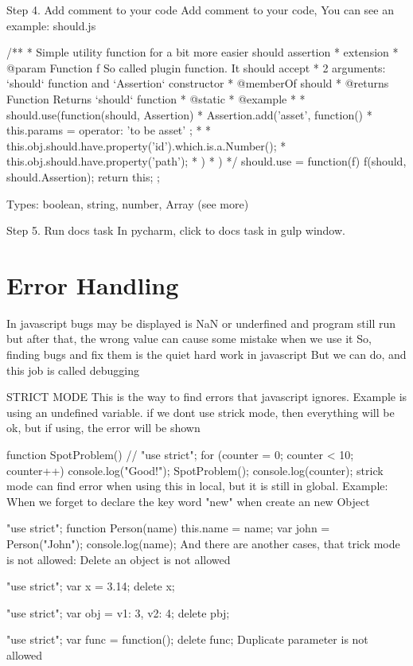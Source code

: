 Step 4. Add comment to your code
Add comment to your code, You can see an example: should.js

/**
 * Simple utility function for a bit more easier should assertion
 * extension
 * @param {Function} f So called plugin function. It should accept
 * 2 arguments: `should` function and `Assertion` constructor
 * @memberOf should
 * @returns {Function} Returns `should` function
 * @static
 * @example
 *
 * should.use(function(should, Assertion) {
 *   Assertion.add('asset', function() {
 *      this.params = { operator: 'to be asset' };
 *
 *      this.obj.should.have.property('id').which.is.a.Number();
 *      this.obj.should.have.property('path');
 *  })
 * })
 */
should.use = function(f) {
  f(should, should.Assertion);
  return this;
};

Types: boolean, string, number, Array (see more)

Step 5. Run docs task
In pycharm, click to docs task in gulp window.

\section{Error Handling}

In javascript bugs may be displayed is NaN or underfined and program still run but after that, the wrong value can cause some mistake when we use it So, finding bugs and fix them is the quiet hard work in javascript But we can do, and this job is called debugging

STRICT MODE
This is the way to find errors that javascript ignores. Example is using an undefined variable. if we dont use strick mode, then everything will be ok, but if using, the error will be shown

function SpotProblem(){
//     "use strict";
    for (counter = 0; counter < 10; counter++){
        console.log("Good!");
    }
}
SpotProblem();
console.log(counter);
strick mode can find error when using this in local, but it is still in global. Example: When we forget to declare the key word "new" when create an new Object

"use strict";
function Person(name){
    this.name = name;
}
var john = Person("John");
console.log(name);
And there are another cases, that trick mode is not allowed: Delete an object is not allowed

"use strict";
var x = 3.14;
delete x;

"use strict";
var obj = {v1: 3, v2: 4};
delete pbj;

"use strict";
var func = function(){};
delete func;
Duplicate parameter is not allowed

